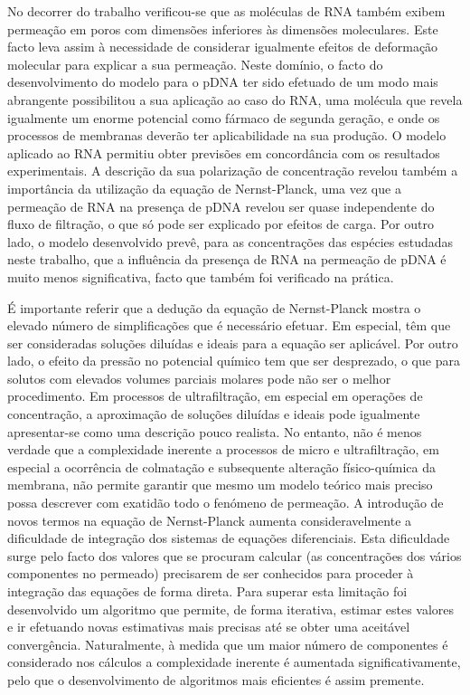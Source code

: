 No decorrer do trabalho verificou-se que as moléculas de RNA também exibem permeação em poros com dimensões inferiores às dimensões moleculares. Este facto leva assim à necessidade de considerar igualmente efeitos de deformação molecular para explicar a sua permeação. Neste domínio, o facto do desenvolvimento do modelo para o pDNA ter sido efetuado de um modo mais abrangente possibilitou a sua aplicação ao caso do RNA, uma molécula que revela igualmente um enorme potencial como fármaco de segunda geração, e onde os processos de membranas deverão ter aplicabilidade na sua produção. O modelo aplicado ao RNA permitiu obter previsões em concordância com os resultados experimentais. A descrição da sua polarização de concentração revelou também a importância da utilização da equação de Nernst-Planck, uma vez que a permeação de RNA na presença de pDNA revelou ser quase independente do fluxo de filtração, o que só pode ser explicado por efeitos de carga. Por outro lado, o modelo desenvolvido prevê, para as concentrações das espécies estudadas neste trabalho, que a influência da presença de RNA na permeação de pDNA é muito menos significativa, facto que também foi verificado na prática.

É importante referir que a dedução da equação de Nernst-Planck mostra o elevado número de simplificações que é necessário efetuar. Em especial, têm que ser consideradas soluções diluídas e ideais para a equação ser aplicável. Por outro lado, o efeito da pressão no potencial químico tem que ser desprezado, o que para solutos com elevados volumes parciais molares pode não ser o melhor procedimento. Em processos de ultrafiltração, em especial em operações de concentração, a aproximação de soluções diluídas e ideais pode igualmente apresentar-se como uma descrição pouco realista. No entanto, não é menos verdade que a complexidade inerente a processos de micro e ultrafiltração, em especial a ocorrência de colmatação e subsequente alteração físico-química da membrana, não permite garantir que mesmo um modelo teórico mais preciso possa descrever com exatidão todo o fenómeno de permeação. A introdução de novos termos na equação de Nernst-Planck aumenta consideravelmente a dificuldade de integração dos sistemas de equações diferenciais. Esta dificuldade surge pelo facto dos valores que se procuram calcular (as concentrações dos vários componentes no permeado) precisarem de ser conhecidos para proceder à integração das equações de forma direta. Para superar esta limitação foi desenvolvido um algoritmo que permite, de forma iterativa, estimar estes valores e ir efetuando novas estimativas mais precisas até se obter uma aceitável convergência. Naturalmente, à medida que um maior número de componentes é considerado nos cálculos a complexidade inerente é aumentada significativamente, pelo que o desenvolvimento de algoritmos mais eficientes é assim premente. 

